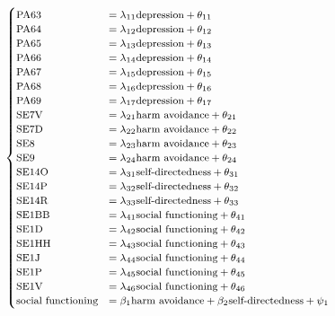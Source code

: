 \documentclass[11pt]{article}
\begin{document}
\begin{equation}
    \footnotesize
    \label{eq:base_model}
    \begin{cases}
    \textrm{PA63}  & = \lambda_{11} \textrm{depression}         + \theta_{11} \\
    \textrm{PA64}  & = \lambda_{12} \textrm{depression}         + \theta_{12} \\
    \textrm{PA65}  & = \lambda_{13} \textrm{depression}         + \theta_{13} \\
    \textrm{PA66}  & = \lambda_{14} \textrm{depression}         + \theta_{14} \\
    \textrm{PA67}  & = \lambda_{15} \textrm{depression}         + \theta_{15} \\
    \textrm{PA68}  & = \lambda_{16} \textrm{depression}         + \theta_{16} \\
    \textrm{PA69}  & = \lambda_{17} \textrm{depression}         + \theta_{17} \\
    \textrm{SE7V}  & = \lambda_{21} \textrm{harm avoidance}     + \theta_{21} \\
    \textrm{SE7D}  & = \lambda_{22} \textrm{harm avoidance}     + \theta_{22} \\
    \textrm{SE8}   & = \lambda_{23} \textrm{harm avoidance}     + \theta_{23} \\
    \textrm{SE9}   & = \lambda_{24} \textrm{harm avoidance}     + \theta_{24} \\
    \textrm{SE14O} & = \lambda_{31} \textrm{self-directedness}  + \theta_{31} \\
    \textrm{SE14P} & = \lambda_{32} \textrm{self-directedness}  + \theta_{32} \\
    \textrm{SE14R} & = \lambda_{33} \textrm{self-directedness}  + \theta_{33} \\
    \textrm{SE1BB} & = \lambda_{41} \textrm{social functioning} + \theta_{41} \\
    \textrm{SE1D}  & = \lambda_{42} \textrm{social functioning} + \theta_{42} \\
    \textrm{SE1HH} & = \lambda_{43} \textrm{social functioning} + \theta_{43} \\
    \textrm{SE1J}  & = \lambda_{44} \textrm{social functioning} + \theta_{44} \\
    \textrm{SE1P}  & = \lambda_{45} \textrm{social functioning} + \theta_{45} \\
    \textrm{SE1V}  & = \lambda_{46} \textrm{social functioning} + \theta_{46} \\
    \textrm{social functioning} & = \beta_1 \textrm{harm avoidance} + \beta_2 \textrm{self-directedness} + \psi_1 \\

\end{cases}
\end{equation}
\end{document}
